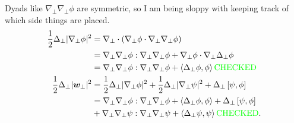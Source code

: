 \documentclass{article}
\newcommand{\np}{\nabla_\perp}
\newcommand{\lap}{\Delta_\perp}
\newcommand{\pth} [1] {\left( #1 \right) }
\newcommand{\br} [1] {\left[ #1 \right] }
\begin{document}
Dyads like $\np\np\phi$ are symmetric, so I am being sloppy with keeping track of which side things are placed. 
\begin{align*}
    \frac{1}{2} \lap|\np\phi|^2 &= \np\cdot \pth{\np\phi\cdot\np\np\phi} \\ 
        &= \np\np\phi:\np\np\phi + \np\phi\cdot\np\lap\phi \\ 
        &= \np\np\phi:\np\np\phi + \Braket{\lap\phi, \phi} \text{\color{green} CHECKED} \\
    \frac{1}{2} \lap|\bm{w}_\perp|^2 &= \frac{1}{2} \lap|\np\phi|^2 + \frac{1}{2} \lap|\np\psi|^2 + \lap \br{\psi, \phi} \\ 
        &= \np\np\phi:\np\np\phi + \Braket{\lap\phi, \phi} + \lap\br{\psi, \phi} \\ 
        &+ \np\np\psi:\np\np\psi + \Braket{\lap\psi, \psi} \text{\color{green} CHECKED}. 
\end{align*}
\end{document}
